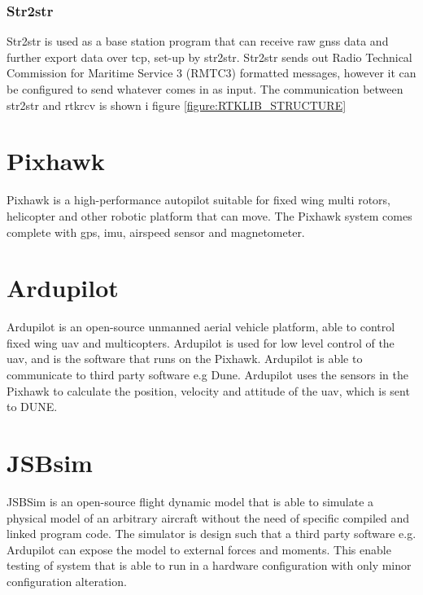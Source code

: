 \subsubsection{Str2str}
Str2str is used as a base station program that can receive raw \gls{gnss} data and further export data over tcp, set-up by str2str. Str2str sends out Radio Technical Commission for Maritime Service 3 (RMTC3) formatted messages, however it can be configured to send whatever comes in as input. The communication between str2str and rtkrcv is shown i figure \ref{figure:RTKLIB_STRUCTURE}
\section{Pixhawk}
Pixhawk is a high-performance autopilot suitable for fixed wing multi rotors, helicopter and other robotic platform that can move. The Pixhawk system comes complete with \gls{gps}, imu, airspeed sensor and magnetometer.
\section{Ardupilot}
Ardupilot is an open-source unmanned aerial vehicle platform, able to control fixed wing \gls{uav} and multicopters. Ardupilot is used for low level control of the \gls{uav}, and is the software that runs on the Pixhawk. Ardupilot is able to communicate to third party software e.g Dune. Ardupilot uses the sensors in the Pixhawk to calculate the position, velocity and attitude of the \gls{uav}, which is sent to DUNE.
\section{JSBsim}
JSBSim \citep{berndt2004jsbsim} is an open-source flight dynamic model that is able to simulate a physical model of an arbitrary aircraft without the need of specific compiled and linked program code. The simulator is design such that a third party software e.g. Ardupilot can expose the model to external forces and moments. This enable  testing of system that is able to run in a hardware configuration with only minor configuration alteration.
\cleardoublepage